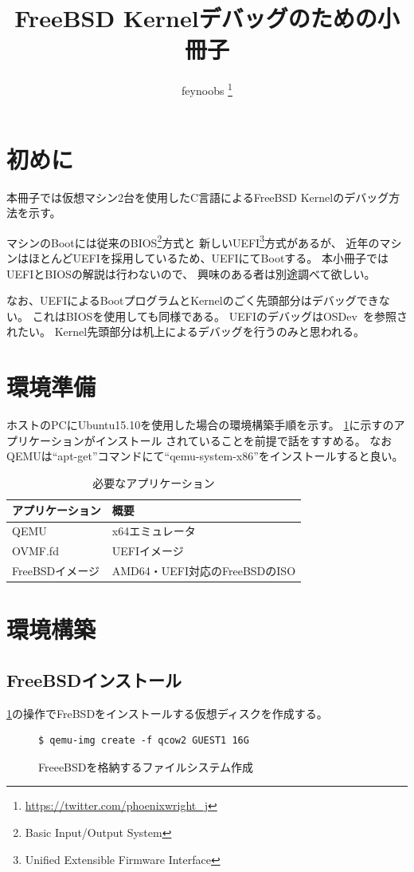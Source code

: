 \documentclass[a4j]{jarticle}
\title{FreeBSD Kernelデバッグのための小冊子}
\author{feynoobs \thanks{\protect\url{https://twitter.com/phoenixwright_j}}}
\begin{document}
\maketitle

\tableofcontents

\newpage

\section{初めに}
本冊子では仮想マシン2台を使用したC言語によるFreeBSD Kernelのデバッグ方法を示す。

マシンのBootには従来のBIOS\footnote{Basic Input/Output System}方式と
新しいUEFI\footnote{Unified Extensible Firmware Interface}方式があるが、
近年のマシンはほとんどUEFIを採用しているため、UEFIにてBootする。
本小冊子ではUEFIとBIOSの解説は行わないので、
興味のある者は別途調べて欲しい。

なお、UEFIによるBootプログラムとKernelのごく先頭部分はデバッグできない。
これはBIOSを使用しても同様である。
UEFIのデバッグはOSDev~\cite{OSDev}を参照されたい。
Kernel先頭部分は机上によるデバッグを行うのみと思われる。

\section{環境準備}
ホストのPCにUbuntu15.10を使用した場合の環境構築手順を示す。
\ref{tb:FreeBSD:_ENV}に示すのアプリケーションがインストール
されていることを前提で話をすすめる。
なおQEMUは``apt-get''コマンドにて``qemu-system-x86''をインストールすると良い。
\begin{table}[htp]
	\caption{必要なアプリケーション}
	\label{tb:FreeBSD:_ENV}
	\centering
	\begin{tabular}{|l|p{10cm}|}									\hline
		アプリケーション	&	概要							\\	\hline	\hline
		QEMU				&	x64エミュレータ				\\	\hline
		OVMF.fd				&	UEFIイメージ					\\	\hline
		FreeBSDイメージ		&	AMD64・UEFI対応のFreeBSDのISO	\\	\hline
	\end{tabular}
\end{table}

\section{環境構築}
\subsection{FreeBSDインストール}
\label{sec:FreeBSD_inst}
\ref{fig:FreeBSD_CREATE}の操作でFreBSDをインストールする仮想ディスクを作成する。
\begin{figure}[htbp]
	\centering
	\begin{lstlisting}[basicstyle=\ttfamily\footnotesize, frame=single, breaklines=true]
$ qemu-img create -f qcow2 GUEST1 16G
	\end{lstlisting}
	\caption{FreeeBSDを格納するファイルシステム作成}
	\label{fig:FreeBSD_CREATE}
\end{figure}
\end{document}
